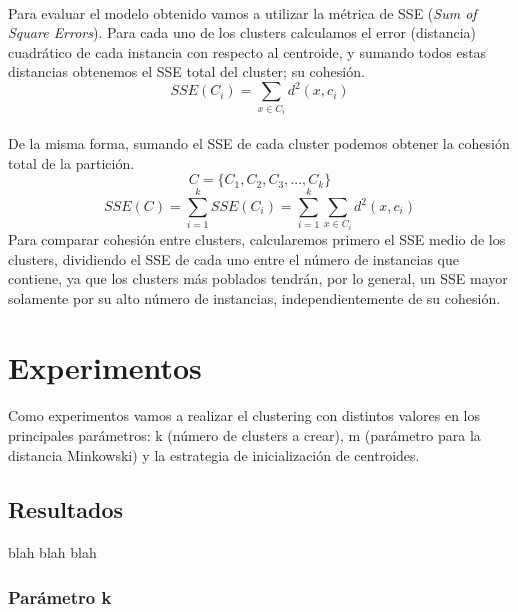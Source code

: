 \documentclass[10pt,a4paper]{article}
\begin{document}
	\paragraph{}
	Para evaluar el modelo obtenido vamos a utilizar la métrica de SSE (\textit{Sum of Square Errors}). Para cada uno de los clusters calculamos el error (distancia) cuadrático de cada instancia con respecto al centroide, y sumando todos estas distancias obtenemos el SSE total del cluster; su cohesión.
	\begin{equation}
		SSE(C_i) = \sum_{x \in C_i} d^2(x, c_i)
	\end{equation}
	\paragraph{}
	De la misma forma, sumando el SSE de cada cluster podemos obtener la cohesión total de la partición.
		$$C = \{C_1, C_2, C_3, ..., C_k\}$$
	\begin{equation}
		SSE(C) = \sum^{k}_{i=1} SSE(C_i) = \sum^{k}_{i=1} \sum_{x \in C_i} d^2(x, c_i)
	\end{equation}
	Para comparar cohesión entre clusters, calcularemos primero el SSE medio de los clusters, dividiendo el SSE de cada uno entre el número de instancias que contiene, ya que los clusters más poblados tendrán, por lo general, un SSE mayor solamente por su alto número de instancias, independientemente de su cohesión.
	
\section{Experimentos}
	\paragraph{}
	Como experimentos vamos a realizar el clustering con distintos valores en los principales parámetros: k (número de clusters a crear), m (parámetro para la distancia Minkowski) y la estrategia de inicialización de centroides.
	
	\subsection{Resultados}
	\paragraph{}
	blah blah blah
	
	\subsubsection{Parámetro k}
\end{document}
